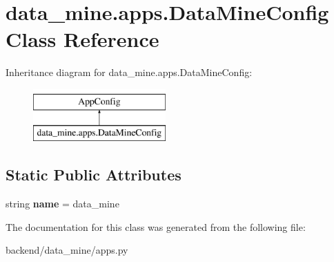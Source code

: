 \hypertarget{classdata__mine_1_1apps_1_1_data_mine_config}{}\section{data\+\_\+mine.\+apps.\+Data\+Mine\+Config Class Reference}
\label{classdata__mine_1_1apps_1_1_data_mine_config}
Inheritance diagram for data\+\_\+mine.\+apps.\+Data\+Mine\+Config\+:\begin{figure}[H]
\begin{center}
\leavevmode
\includegraphics[height=2.000000cm]{classdata__mine_1_1apps_1_1_data_mine_config}
\end{center}
\end{figure}
\subsection*{Static Public Attributes}
\begin{DoxyCompactItemize}
\item 
\mbox{\label{classdata__mine_1_1apps_1_1_data_mine_config_a458cf75e478f98cc2882951a3b52690c}} 
string {\bfseries name} = \textquotesingle{}data\+\_\+mine\textquotesingle{}
\end{DoxyCompactItemize}


The documentation for this class was generated from the following file\+:\begin{DoxyCompactItemize}
\item 
backend/data\+\_\+mine/apps.\+py\end{DoxyCompactItemize}
